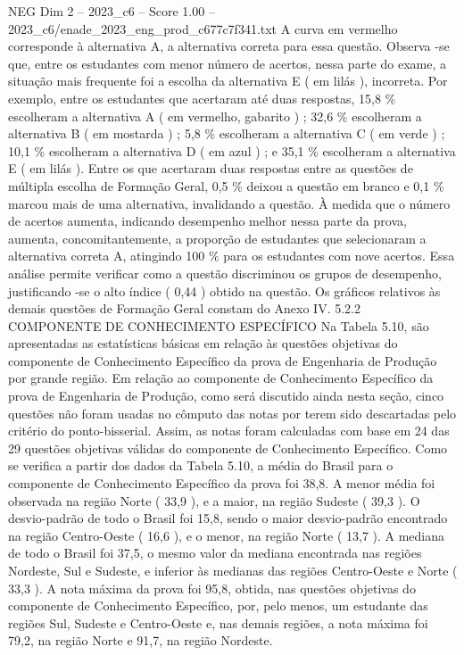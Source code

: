 \begin{textsample}{NEG Dim 2 – 2023\_c6 – Score 1.00 – 2023\_c6/enade\_2023\_eng\_prod\_c677c7f341.txt}
A curva em vermelho corresponde à alternativa A, a alternativa correta para essa questão.
Observa -se que, entre os estudantes com menor número de acertos, nessa parte do exame, a situação mais frequente foi a escolha da alternativa E ( em lilás ), incorreta.
Por exemplo, entre os estudantes que acertaram até duas respostas, 15,8 \% escolheram a alternativa A ( em vermelho, gabarito ) ; 32,6 \% escolheram a alternativa B ( em mostarda ) ; 5,8 \% escolheram a alternativa C ( em verde ) ; 10,1 \% escolheram a alternativa D ( em azul ) ; e 35,1 \% escolheram a alternativa E ( em lilás ).
Entre os que acertaram duas respostas entre as questões de múltipla escolha de Formação Geral, 0,5 \% deixou a questão em branco e 0,1 \% marcou mais de uma alternativa, invalidando a questão.
À medida que o número de acertos aumenta, indicando desempenho melhor nessa parte da prova, aumenta, concomitantemente, a proporção de estudantes que selecionaram a alternativa correta A, atingindo 100 \% para os estudantes com nove acertos.
Essa análise permite verificar como a questão discriminou os grupos de desempenho, justificando -se o alto índice ( 0,44 ) obtido na questão.
Os gráficos relativos às demais questões de Formação Geral constam do Anexo IV. 5.2.2 COMPONENTE DE CONHECIMENTO ESPECÍFICO Na Tabela 5.10, são apresentadas as estatísticas básicas em relação às questões objetivas do componente de Conhecimento Específico da prova de Engenharia de Produção por grande região.
Em relação ao componente de Conhecimento Específico da prova de Engenharia de Produção, como será discutido ainda nesta seção, cinco questões não foram usadas no cômputo das notas por terem sido descartadas pelo critério do ponto-bisserial.
Assim, as notas foram calculadas com base em 24 das 29 questões objetivas válidas do componente de Conhecimento Específico.
Como se verifica a partir dos dados da Tabela 5.10, a média do Brasil para o componente de Conhecimento Específico da prova foi 38,8.
A menor média foi observada na região Norte ( 33,9 ), e a maior, na região Sudeste ( 39,3 ).
O desvio-padrão de todo o Brasil foi 15,8, sendo o maior desvio-padrão encontrado na região Centro-Oeste ( 16,6 ), e o menor, na região Norte ( 13,7 ).
A mediana de todo o Brasil foi 37,5, o mesmo valor da mediana encontrada nas regiões Nordeste, Sul e Sudeste, e inferior às medianas das regiões Centro-Oeste e Norte ( 33,3 ).
A nota máxima da prova foi 95,8, obtida, nas questões objetivas do componente de Conhecimento Específico, por, pelo menos, um estudante das regiões Sul, Sudeste e Centro-Oeste e, nas demais regiões, a nota máxima foi 79,2, na região Norte e 91,7, na região Nordeste.

\end{textsample}
